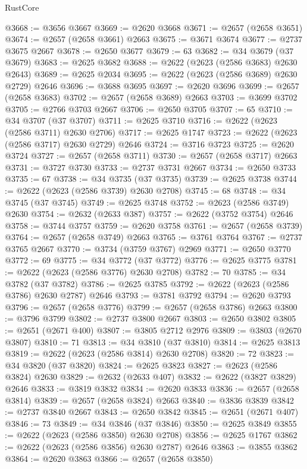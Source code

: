 \begin{lexlean}{RustCore}
\begin{coremodule}
@3668 := @3656 @3667
@3669 := @2620 @3668
@3671 := @2657 (@2658 @3651)
@3674 := @2657 (@2658 @3661) @2663
@3675 := @3671 @3674
@3677 := @2737 @3675 @2667
@3678 := @2650 @3677
@3679 := 63
@3682 := @34 @3679 (@37 @3679)
@3683 := @2625 @3682
@3688 := @2622 (@2623 (@2586 @3683) @2630 @2643)
@3689 := @2625 @2034
@3695 := @2622 (@2623 (@2586 @3689) @2630 @2729) @2646
@3696 := @3688 @3695
@3697 := @2620 @3696
@3699 := @2657 (@2658 @3683)
@3702 := @2657 (@2658 @3689) @2663
@3703 := @3699 @3702
@3705 := @2766 @3703 @2667
@3706 := @2650 @3705
@3707 := 65
@3710 := @34 @3707 (@37 @3707)
@3711 := @2625 @3710
@3716 := @2622 (@2623 (@2586 @3711) @2630 @2706)
@3717 := @2625 @1747
@3723 := @2622 (@2623 (@2586 @3717) @2630 @2729) @2646
@3724 := @3716 @3723
@3725 := @2620 @3724
@3727 := @2657 (@2658 @3711)
@3730 := @2657 (@2658 @3717) @2663
@3731 := @3727 @3730
@3733 := @2737 @3731 @2667
@3734 := @2650 @3733
@3735 := 67
@3738 := @34 @3735 (@37 @3735)
@3739 := @2625 @3738
@3744 := @2622 (@2623 (@2586 @3739) @2630 @2708)
@3745 := 68
@3748 := @34 @3745 (@37 @3745)
@3749 := @2625 @3748
@3752 := @2623 (@2586 @3749) @2630
@3754 := @2632 (@2633 @387)
@3757 := @2622 (@3752 @3754) @2646
@3758 := @3744 @3757
@3759 := @2620 @3758
@3761 := @2657 (@2658 @3739)
@3764 := @2657 (@2658 @3749) @2663
@3765 := @3761 @3764
@3767 := @2737 @3765 @2667
@3770 := @3734 (@3759 @3767) @2969
@3771 := @2650 @3770
@3772 := 69
@3775 := @34 @3772 (@37 @3772)
@3776 := @2625 @3775
@3781 := @2622 (@2623 (@2586 @3776) @2630 @2708)
@3782 := 70
@3785 := @34 @3782 (@37 @3782)
@3786 := @2625 @3785
@3792 := @2622 (@2623 (@2586 @3786) @2630 @2787) @2646
@3793 := @3781 @3792
@3794 := @2620 @3793
@3796 := @2657 (@2658 @3776)
@3799 := @2657 (@2658 @3786) @2663
@3800 := @3796 @3799
@3802 := @2737 @3800 @2667
@3803 := @2650 @3802
@3805 := @2651 (@2671 @400)
@3807 := @3805 @2712 @2976
@3809 := @3803 (@2670 @3807)
@3810 := 71
@3813 := @34 @3810 (@37 @3810)
@3814 := @2625 @3813
@3819 := @2622 (@2623 (@2586 @3814) @2630 @2708)
@3820 := 72
@3823 := @34 @3820 (@37 @3820)
@3824 := @2625 @3823
@3827 := @2623 (@2586 @3824) @2630
@3829 := @2632 (@2633 @407)
@3832 := @2622 (@3827 @3829) @2646
@3833 := @3819 @3832
@3834 := @2620 @3833
@3836 := @2657 (@2658 @3814)
@3839 := @2657 (@2658 @3824) @2663
@3840 := @3836 @3839
@3842 := @2737 @3840 @2667
@3843 := @2650 @3842
@3845 := @2651 (@2671 @407)
@3846 := 73
@3849 := @34 @3846 (@37 @3846)
@3850 := @2625 @3849
@3855 := @2622 (@2623 (@2586 @3850) @2630 @2708)
@3856 := @2625 @1767
@3862 := @2622 (@2623 (@2586 @3856) @2630 @2787) @2646
@3863 := @3855 @3862
@3864 := @2620 @3863
@3866 := @2657 (@2658 @3850)

\end{coremodule}
\end{lexlean}
